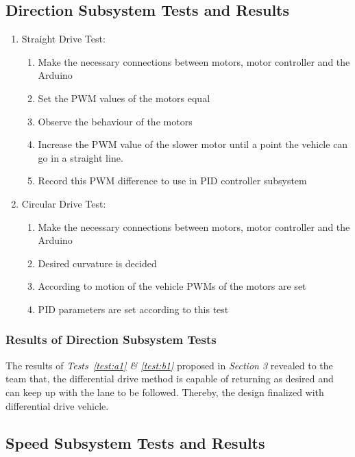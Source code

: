 \documentclass[a4paper,12pt]{article}
\begin{document}


\subsection {Direction Subsystem Tests and Results}

	\begin{enumerate}
		\item Straight Drive Test: \label{test:a1}	
		\begin{enumerate}
			\item Make the necessary connections between motors, motor controller and the Arduino  
			\item Set the PWM values of the motors equal  
			\item Observe the behaviour of the motors  
			\item Increase the PWM value of the slower motor until a point the vehicle can go in a straight line.
			\item Record this PWM difference to use in PID controller subsystem
		\end{enumerate}

		\item Circular Drive Test: \label{test:b1}	
		\begin{enumerate}
			\item Make the necessary connections between motors, motor controller and the Arduino  
			\item Desired curvature is decided  
			\item  According to motion of the vehicle PWMs of the motors are set  
			\item  PID parameters are set according to this test
		\end{enumerate}
	\end{enumerate}

\subsubsection*{Results of Direction Subsystem Tests}

	The results of \textit{Tests~\ref{test:a1} \& \ref{test:b1}} proposed in \textit{Section 3} revealed to the team that, the differential drive method is capable of returning as desired and can keep up with the lane to be followed. Thereby, the design finalized with differential drive vehicle.




\subsection {Speed Subsystem Tests and Results}
\end{document}
